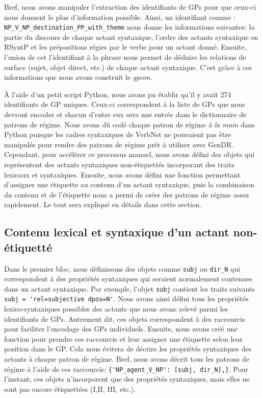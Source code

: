Bref, nous avons manipuler l'extraction des identifiants de \acp{GP} pour que ceux-ci nous donnent le plus d'information possible. Ainsi, un identifiant comme : \texttt{NP\_V\_NP\_destination\_PP\_with\_theme} nous donne les informations suivantes: la partie du discours de chaque actant syntaxique, l'ordre des actants syntaxique en \ac{RSyntP} et les prépositions régies par le verbe pour un actant donné. Ensuite, l'union de cet l'identifiant à la phrase  nous permet de déduire les relations de surface (sujet, objet direct, etc.) de chaque actant syntaxique. C'est grâce à ces informations que nous avons construit le \emph{gpcon}.

À l'aide d'un petit script Python, nous avons pu établir qu'il y avait 274 identifiants de \ac{GP} uniques. Ceux-ci correspondent à la liste de \acp{GP} que nous devront encoder et chacun d'entre eux sera une entrée dans le dictionnaire de patrons de régime. Nous avons dû codé chaque patron de régime \emph{à la main} dans Python puisque les cadres syntaxiques de VerbNet ne pouvaient pas être manipulés pour rendre des patrons de régime prêt à utiliser avec GenDR. Cependant, pour accélérer ce processus manuel, nous avons défini des objets qui représentent des actants syntaxiques non-étiquettés incorporant des traits lexicaux et syntaxiques. Ensuite, nous avons défini une fonction permettant d'assigner une étiquette au contenu d'un actant syntaxique, puis la combinaison du contenu et de l'étiquette nous a permi de créer des patrons de régime assez rapidement. Le tout sera expliqué en détails dans cette section.

\subsection{Contenu lexical et syntaxique d'un actant non-étiquetté}

Dans le premier bloc, nous définissons des objets comme \texttt{subj} ou \texttt{dir\_N} qui correspondent à des propriétés syntaxiques qui seraient normalement contenues dans un actant syntaxique. Par exemple, l'objet \texttt{subj} contient les traits suivants \lstinline|subj = 'rel=subjective dpos=N'|. Nous avons ainsi défini tous les propriétés lexico-syntaxiques possibles des actants que nous avons relevé parmi les identifiants de \acp{GP}. Autrement dit, ces objets correspondent à des raccourcis pour faciliter l'encodage des \acp{GP} individuels. Ensuite, nous avons créé une fonction pour prendre ces raccourcis et leur assigner une étiquette selon leur position dans le \ac{GP}. Cela nous évitera de décrire les propriétés syntaxiques des actants à chaque patron de régime. Bref, nous avons décrit tous les patrons de régime à l'aide de ces raccourcis: \lstinline|{'NP_agent_V_NP': [subj, dir_N],}|. Pour l'instant, ces objets n'incorporent que des propriétés syntaxiques, mais elles ne sont pas encore étiquettées (I,II, III, etc.).

